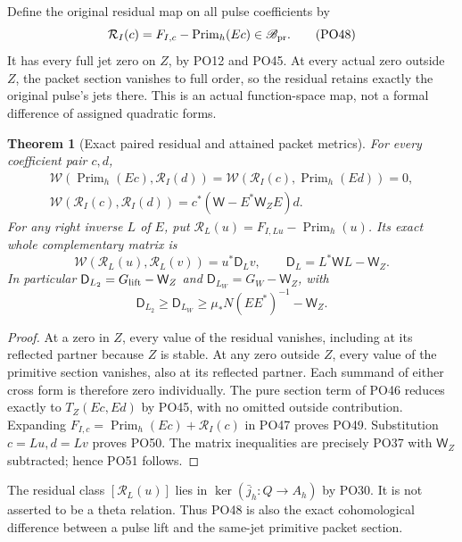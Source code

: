 \documentclass[11pt,a4paper]{article}
\newtheorem{theorem}{Theorem}[section]
\theoremstyle{definition}\newtheorem{definition}[theorem]{Definition}
\begin{document}
Define the original residual map on all pulse coefficients by
\[
 \mathcal R_I(c)=F_{I,c}-\operatorname{Prim}_h(Ec)\in\mathscr B_{\rm pr}.
 \tag{PO48}\label{PO:po:residual}
\]
It has every full jet zero on \(Z\), by PO12 and PO45.
At every actual zero outside \(Z\), the packet section vanishes
to full order, so the residual retains exactly the original
pulse's jets there. This is an actual function-space map,
not a formal difference of assigned quadratic forms.

\begin{theorem}[Exact paired residual and attained packet metrics]
\label{PO:thm:residual}
For every coefficient pair \(c,d\),
\[
 \begin{gathered}
 \mathcal W(\operatorname{Prim}_h(Ec),\mathcal R_I(d))
 =\mathcal W(\mathcal R_I(c),\operatorname{Prim}_h(Ed))=0,\\
 \mathcal W(\mathcal R_I(c),\mathcal R_I(d))
      =c^*(\mathsf W-E^*\mathsf W_ZE)d .
 \end{gathered}
 \tag{PO49}\label{PO:po:orthogonal}
\]
For any right inverse \(L\) of \(E\), put
\(\mathcal R_L(u)=F_{I,Lu}-\operatorname{Prim}_h(u)\).
Its exact whole complementary matrix is
\[
 \mathcal W(\mathcal R_L(u),\mathcal R_L(v))
       =u^*\mathsf D_Lv,\qquad
 \boxed{\mathsf D_L=L^*\mathsf W L-\mathsf W_Z.}
 \tag{PO50}\label{PO:po:complement}
\]
In particular
\(\mathsf D_{L_2}=G_{\rm lift}-\mathsf W_Z\) and
\(\mathsf D_{L_W}=G_W-\mathsf W_Z\), with
\[
 \mathsf D_{L_2}\ge\mathsf D_{L_W}
       \ge\mu_*N(EE^*)^{-1}-\mathsf W_Z .
 \tag{PO51}\label{PO:po:residual-lower}
\]
\end{theorem}
\begin{proof}
At a zero in \(Z\), every value of the residual vanishes,
including at its reflected partner because \(Z\) is stable.
At any zero outside \(Z\), every value of the primitive section
vanishes, also at its reflected partner.
Each summand of either cross form is therefore zero individually.
The pure section term of PO46 reduces exactly to \(T_Z(Ec,Ed)\)
by PO45, with no omitted outside contribution.
Expanding \(F_{I,c}=\operatorname{Prim}_h(Ec)+\mathcal R_I(c)\)
in PO47 proves PO49. Substitution \(c=Lu,d=Lv\) proves PO50.
The matrix inequalities are precisely PO37 with
\(\mathsf W_Z\) subtracted; hence PO51 follows.
\end{proof}

The residual class \([\mathcal R_L(u)]\) lies in
\(\ker(\bar j_h:Q\to A_h)\) by PO30.
It is not asserted to be a theta relation. Thus PO48 is also
the exact cohomological difference between a pulse lift and
the same-jet primitive packet section.
\end{document}
